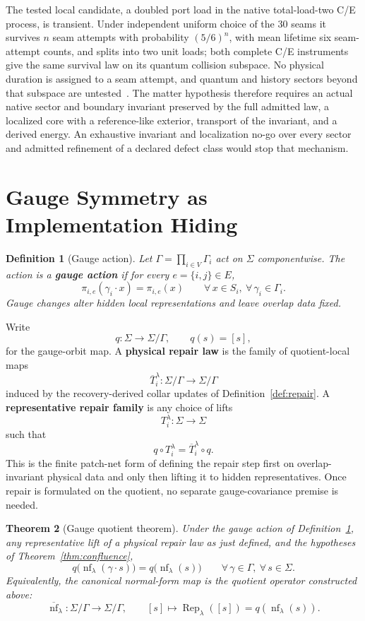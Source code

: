 \documentclass[11pt]{article}
\newtheorem{theorem}{Theorem}[section]
\newtheorem{definition}[theorem]{Definition}
\theoremstyle{remark}
\theoremstyle{plain}
\begin{document}
The tested local candidate, a doubled port load in the native total-load-two
C/E process, is transient. Under independent uniform choice of the 30
seams it survives \(n\) seam attempts with probability \((5/6)^n\), with
mean lifetime six seam-attempt counts, and splits into two unit loads; both
complete C/E instruments give the same survival law on its quantum collision
subspace. No physical duration is assigned to a seam attempt, and quantum
and history sectors beyond that subspace are untested~\cite{ophmodelguide}.
The matter hypothesis therefore requires an actual native sector and
boundary invariant preserved by the full admitted law, a localized core
with a reference-like exterior, transport of the invariant, and a derived
energy. An exhaustive invariant and localization no-go over every sector
and admitted refinement of a declared defect class would stop that
mechanism.

\section{Gauge Symmetry as Implementation Hiding}

\begin{definition}[Gauge action]\label{def:gauge}
Let $\Gamma = \prod_{i\in V}\Gamma_i$ act on $\Sigma$ componentwise. The action is a \textbf{gauge action} if for every $e=\{i,j\}\in E$,
\[
\pi_{i,e}(\gamma_i\cdot x)=\pi_{i,e}(x)
\qquad
\forall\, x\in S_i,\ \forall\, \gamma_i\in \Gamma_i.
\]
Gauge changes alter hidden local representations and leave overlap data fixed.
\end{definition}

Write
\[
q:\Sigma\to \Sigma/\Gamma,
\qquad
q(s)=[s],
\]
for the gauge-orbit map. A \textbf{physical repair law} is the family of quotient-local maps
\[
\overline T_i^\lambda:\Sigma/\Gamma\to \Sigma/\Gamma
\]
induced by the recovery-derived collar updates of Definition~\ref{def:repair}. A
\textbf{representative repair family} is any choice of lifts
\[
T_i^\lambda:\Sigma\to\Sigma
\]
such that
\[
q\circ T_i^\lambda
=
\overline T_i^\lambda\circ q.
\]
This is the finite patch-net form of defining the repair step first on overlap-invariant
physical data and only then lifting it to hidden representatives. Once repair is formulated on
the quotient, no separate gauge-covariance premise is needed.

\begin{theorem}[Gauge quotient theorem]\label{thm:gauge}
Under the gauge action of Definition~\ref{def:gauge}, any representative lift of a physical repair
law as just defined, and the hypotheses of Theorem~\ref{thm:confluence},
\[
q\bigl(\operatorname{nf}_\lambda(\gamma\cdot s)\bigr)
=
q\bigl(\operatorname{nf}_\lambda(s)\bigr)
\qquad
\forall\, \gamma\in\Gamma,\ \forall\, s\in\Sigma.
\]
Equivalently, the canonical normal-form map is the quotient operator
constructed above:
\[
\overline{\operatorname{nf}}_\lambda:\Sigma/\Gamma \to \Sigma/\Gamma,
\qquad
[s]\mapsto \operatorname{Rep}_\lambda([s])
=q(\operatorname{nf}_\lambda(s)).
\]
\end{theorem}
\end{document}
